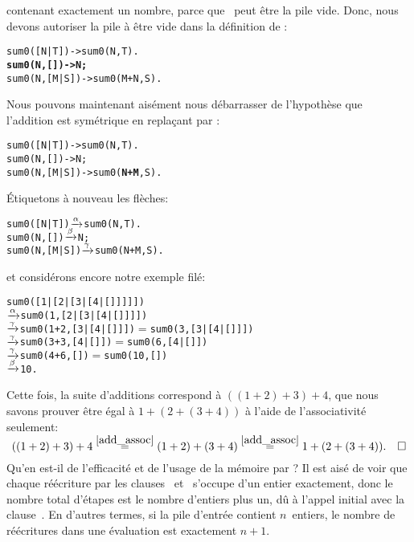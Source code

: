 contenant exactement un nombre, parce que ~peut être la
pile vide. Donc, nous devons autoriser la pile à être vide dans la
définition de :
\begin{alltt}
sum0([N|T])   -> sum0(N,T).
\textbf{sum0(N,   []) -> N;}
sum0(N,[M|S]) -> sum0(M+N,S).
\end{alltt}
Nous pouvons maintenant aisément nous débarrasser de l'hypothèse que
l'addition est symétrique en replaçant  par
:
\begin{alltt}
sum0([N|T])   -> sum0(N,T).
sum0(N,   []) -> N;
sum0(N,[M|S]) -> sum0(\textbf{N+M},S).
\end{alltt}
Étiquetons à nouveau les flèches:
\begin{alltt}
sum0([N|T])   \(\xrightarrow{\smash[t]{\alpha}}\) sum0(N,T).
sum0(N,   []) \(\xrightarrow{\smash[t]{\beta}}\) N;
sum0(N,[M|S]) \(\xrightarrow{\smash[t]{\gamma}}\) sum0(N+M,S).
\end{alltt}
et considérons encore notre exemple filé:
\begin{alltt}
sum0([1|[2|[3|[4|[]]]]])
          \(\xrightarrow{\smash[t]{\alpha}}\) sum0(1,[2|[3|[4|[]]]])
          \(\xrightarrow{\smash[t]{\gamma}}\) sum0(1+2,[3|[4|[]]])   \(=\) sum0(3,[3|[4|[]]])
          \(\xrightarrow{\smash[t]{\gamma}}\) sum0(3+3,[4|[]])       \(=\) sum0(6,[4|[]])
          \(\xrightarrow{\smash[t]{\gamma}}\) sum0(4+6,[])           \(=\) sum0(10,[])
          \(\xrightarrow{\smash[t]{\beta}}\) 10\textrm{.}
\end{alltt}
Cette fois, la suite d'additions correspond à \(((1+2)+3)+4\), que
nous savons prouver être égal à \(1+(2+(3+4))\) à l'aide de
l'associativité seulement:
\begin{equation*}
((1 + 2) + 3) + 4
  \mathrel{\stackrel{\smash{\ref{add_assoc}}}{=}} (1 + 2) + (3 + 4)
  \mathrel{\stackrel{\smash{\ref{add_assoc}}}{=}} 1 + (2 + (3 + 4)).\quad\Box
\end{equation*}
Qu'en est-il de l'efficacité et de l'usage de la mémoire par
? Il est aisé de voir que chaque réécriture par les
clauses~\clause{\beta} et~\clause{\gamma} s'occupe d'un entier
exactement, donc le nombre total d'étapes est le nombre d'entiers plus
un, dû à l'appel initial avec la clause~\clause{\alpha}. En d'autres
termes, si la pile d'entrée contient \(n\)~entiers, le nombre de
réécritures dans une évaluation est exactement \(n+1\).

